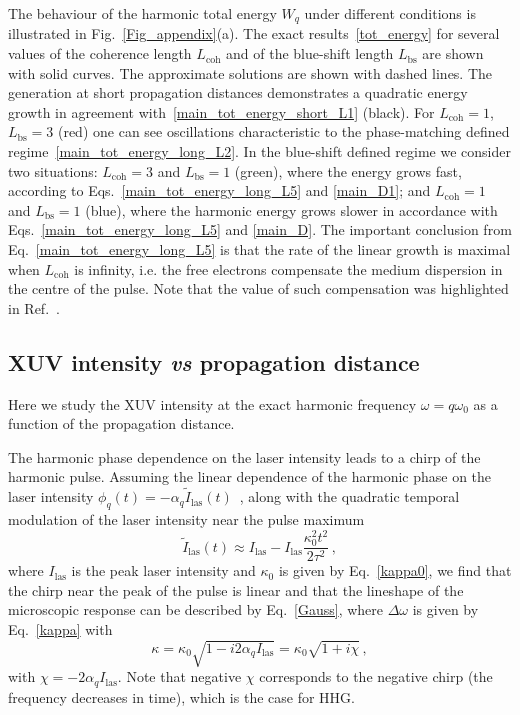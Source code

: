 The behaviour of the harmonic total energy $W_q$ under different conditions is illustrated in Fig.~\ref{Fig_appendix}(a). The exact results~\eqref{tot_energy} for several values of the coherence length $L_\mathrm{coh}$ and of the blue-shift length $L_\mathrm{bs}$ are shown with solid curves. The approximate solutions are shown with dashed lines. The generation at short propagation distances demonstrates a quadratic energy growth in agreement with~\eqref{main_tot_energy_short_L1} (black). For $L_\mathrm{coh}=1$, $L_\mathrm{bs}=3$ (red) one can see oscillations characteristic to the phase-matching defined regime~\eqref{main_tot_energy_long_L2}. In the blue-shift defined regime we consider two situations: $L_\mathrm{coh}=3$ and  $L_\mathrm{bs}=1$ (green), where the energy grows fast, according to Eqs.~\eqref{main_tot_energy_long_L5} and \eqref{main_D1}; and $L_\mathrm{coh}=1$ and $L_\mathrm{bs}=1$ (blue), where the harmonic energy grows slower in accordance with Eqs.~\eqref{main_tot_energy_long_L5} and \eqref{main_D}. The important conclusion from Eq.~\eqref{main_tot_energy_long_L5} is that the rate of the linear growth is maximal when $L_\mathrm{coh}$ is infinity, i.e. the free electrons compensate the medium dispersion in the centre of the pulse. Note that the value of such compensation was highlighted in Ref.~\cite{Rundquist1998}.


%
\subsection{XUV intensity \textit{vs} propagation distance}
%
Here we study the XUV intensity at the exact harmonic frequency $\omega=q \omega_0$ as a function of the propagation distance. 

The harmonic phase dependence on the laser intensity leads to a chirp of the harmonic pulse. Assuming the linear dependence of the harmonic phase on the laser intensity $\phi_q(t)=-\alpha_q \tilde{I}_\mathrm{las}(t)$~\cite{HHG_phase1, Balcou1997, Gaarde_HHG_HFM}, along with the quadratic temporal modulation of the laser intensity near the pulse maximum
$$
\tilde{I}_\mathrm{las}(t) \approx {I}_\mathrm{las}- {I}_\mathrm{las} \frac{\kappa_0^2 t^2}{ 2 \tau^2} \, ,
$$
where $I_\mathrm{las}$ is the peak laser intensity and $\kappa_0$ is given by Eq.~\eqref{kappa0}, we find that the chirp near the peak of the pulse is linear and that the lineshape of the microscopic response can be described by Eq.~\eqref{Gauss}, where $\Delta \omega$ is given by Eq.~\eqref{kappa} with     
\begin{equation}
\label{eq:kappa_G}
\kappa= \kappa_0 \sqrt{ 1-i 2 \alpha_q I_\mathrm{las} }=\kappa_0 \sqrt{1+i \chi} \, ,
\end{equation}
with $\chi=-2 \alpha_q I_\mathrm{las}$. Note that negative $\chi$ corresponds to the negative chirp (the frequency decreases in time), which is the case for HHG. 

